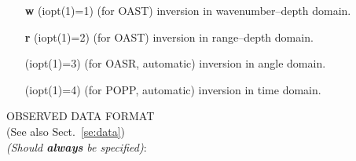 \documentclass{saclantc}
\begin{document}
\vspace{-0.6cm}
\begin{itemize}
    \item[{\bf w}] (iopt(1)=1) (for {\sf OAST}) inversion in wavenumber--depth domain.
\vspace{-0.3cm}
    \item[{\bf r}] (iopt(1)=2) (for {\sf OAST}) inversion in range--depth domain.
\vspace{-0.3cm}
    \item[ ] (iopt(1)=3) (for {\sf OASR}, automatic) inversion in
angle domain.
\vspace{-0.3cm}
    \item[ ] (iopt(1)=4) (for {\sf POPP}, automatic) inversion in time
domain.
\end{itemize}

\noindent OBSERVED DATA FORMAT\\
(See also Sect.~\ref{se:data})\\
{\it (Should {\bf always} be specified)}:
\end{document}

